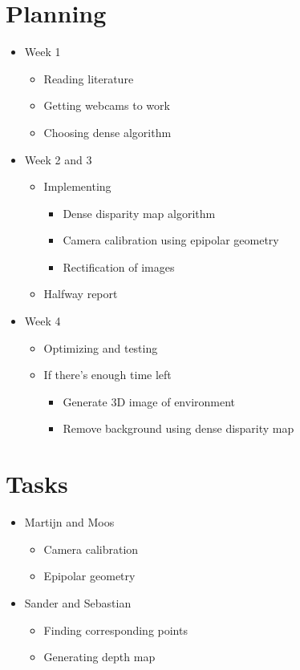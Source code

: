 \documentclass[a4paper]{article}
\begin{document}
\section{Planning}
\begin{itemize}
  \item Week 1
    \begin{itemize}
      \item Reading literature
      \item Getting webcams to work
      \item Choosing dense algorithm
    \end{itemize}
  \item Week 2 and 3
    \begin{itemize}
      \item Implementing
        \begin{itemize}
          \item Dense disparity map algorithm
          \item Camera calibration using epipolar geometry
          \item Rectification of images
        \end{itemize}
      \item Halfway report
    \end{itemize}
  \item Week 4
    \begin{itemize}
      \item Optimizing and testing
      \item If there's enough time left
        \begin{itemize}
          \item Generate 3D image of environment
          \item Remove background using dense disparity map
        \end{itemize}
    \end{itemize}
\end{itemize}

\section{Tasks}
  \begin{itemize}
    \item Martijn and Moos
    \begin{itemize}
      \item Camera calibration
      \item Epipolar geometry
    \end{itemize}
    \item Sander and Sebastian
    \begin{itemize}
      \item Finding corresponding points
      \item Generating depth map
    \end{itemize}
  \end{itemize}



\end{document}
